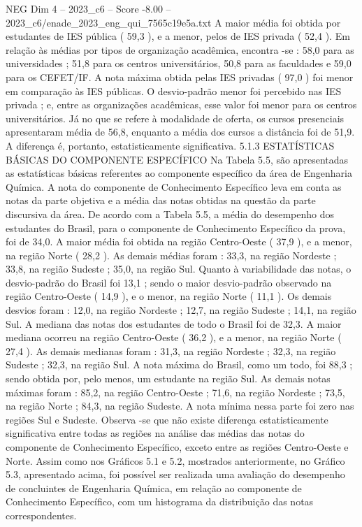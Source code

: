 \begin{textsample}{NEG Dim 4 – 2023\_c6 – Score -8.00 – 2023\_c6/enade\_2023\_eng\_qui\_7565c19e5a.txt}
A maior média foi obtida por estudantes de IES pública ( 59,3 ), e a menor, pelos de IES privada ( 52,4 ).
Em relação às médias por tipos de organização acadêmica, encontra -se : 58,0 para as universidades ; 51,8 para os centros universitários, 50,8 para as faculdades e 59,0 para os CEFET/IF.
A nota máxima obtida pelas IES privadas ( 97,0 ) foi menor em comparação às IES públicas.
O desvio-padrão menor foi percebido nas IES privada ; e, entre as organizações acadêmicas, esse valor foi menor para os centros universitários.
Já no que se refere à modalidade de oferta, os cursos presenciais apresentaram média de 56,8, enquanto a média dos cursos a distância foi de 51,9.
A diferença é, portanto, estatisticamente significativa. 5.1.3 ESTATÍSTICAS BÁSICAS DO COMPONENTE ESPECÍFICO Na Tabela 5.5, são apresentadas as estatísticas básicas referentes ao componente específico da área de Engenharia Química.
A nota do componente de Conhecimento Específico leva em conta as notas da parte objetiva e a média das notas obtidas na questão da parte discursiva da área.
De acordo com a Tabela 5.5, a média do desempenho dos estudantes do Brasil, para o componente de Conhecimento Específico da prova, foi de 34,0.
A maior média foi obtida na região Centro-Oeste ( 37,9 ), e a menor, na região Norte ( 28,2 ).
As demais médias foram : 33,3, na região Nordeste ; 33,8, na região Sudeste ; 35,0, na região Sul.
Quanto à variabilidade das notas, o desvio-padrão do Brasil foi 13,1 ; sendo o maior desvio-padrão observado na região Centro-Oeste ( 14,9 ), e o menor, na região Norte ( 11,1 ).
Os demais desvios foram : 12,0, na região Nordeste ; 12,7, na região Sudeste ; 14,1, na região Sul.
A mediana das notas dos estudantes de todo o Brasil foi de 32,3.
A maior mediana ocorreu na região Centro-Oeste ( 36,2 ), e a menor, na região Norte ( 27,4 ).
As demais medianas foram : 31,3, na região Nordeste ; 32,3, na região Sudeste ; 32,3, na região Sul.
A nota máxima do Brasil, como um todo, foi 88,3 ; sendo obtida por, pelo menos, um estudante na região Sul.
As demais notas máximas foram : 85,2, na região Centro-Oeste ; 71,6, na região Nordeste ; 73,5, na região Norte ; 84,3, na região Sudeste.
A nota mínima nessa parte foi zero nas regiões Sul e Sudeste.
Observa -se que não existe diferença estatisticamente significativa entre todas as regiões na análise das médias das notas do componente de Conhecimento Específico, exceto entre as regiões Centro-Oeste e Norte.
Assim como nos Gráficos 5.1 e 5.2, mostrados anteriormente, no Gráfico 5.3, apresentado acima, foi possível ser realizada uma avaliação do desempenho de concluintes de Engenharia Química, em relação ao componente de Conhecimento Específico, com um histograma da distribuição das notas correspondentes.

\end{textsample}
